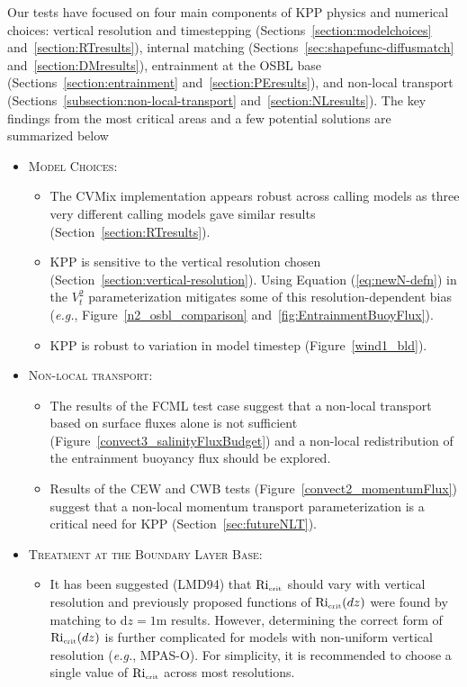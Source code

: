 \documentclass[preprint,12pt,authoryear]{agujournal}
\begin{document}
Our tests have focused on four main components of KPP physics and numerical choices: vertical resolution and timestepping (Sections~\ref{section:modelchoices} and~\ref{section:RTresults}), internal matching (Sections~\ref{sec:shapefunc-diffusmatch} and~\ref{section:DMresults}), entrainment at the OSBL base (Sections~\ref{section:entrainment} and~\ref{section:PEresults}), and non-local transport (Sections~\ref{subsection:non-local-transport} and~\ref{section:NLresults}).  The key findings from the most critical areas and a few potential solutions are summarized below
\begin{itemize}
\item \textsc{Model Choices}: 
\begin{itemize}
\item The CVMix implementation appears robust across calling models as three very different calling models gave similar results (Section~\ref{section:RTresults}).
\item KPP is sensitive to the vertical resolution chosen (Section~\ref{section:vertical-resolution}).  Using Equation (\ref{eq:newN-defn}) in the $V_t^2$ parameterization mitigates some of this resolution-dependent bias (\textit{e.g.}, Figure~\ref{n2_osbl_comparison} and~\ref{fig:EntrainmentBuoyFlux}).
\item KPP is robust to variation in model timestep (Figure~\ref{wind1_bld}).
\end{itemize} 
\item \textsc{Non-local transport}:
\begin{itemize}
\item The results of the FCML test case suggest that a non-local transport based on surface fluxes alone is not sufficient (Figure~\ref{convect3_salinityFluxBudget}) and a non-local redistribution of the entrainment buoyancy flux should be explored.
\item Results of the CEW and CWB tests (Figure~\ref{convect2_momentumFlux}) suggest that a non-local momentum transport parameterization is a critical need for KPP (Section~\ref{sec:futureNLT}).
\end{itemize}
\item \textsc{Treatment at the Boundary Layer Base}:
\begin{itemize}
\item It has been suggested (LMD94) that $\mbox{Ri}_{\mbox{\tiny crit}}$ should vary with vertical resolution and previously proposed functions of $\mbox{Ri}_{\mbox{\tiny crit}}(dz)$ were found by matching to d$z = 1$m results.  However, determining the correct form of $\mbox{Ri}_{\mbox{\tiny crit}}(dz)$ is further complicated for models with non-uniform vertical resolution (\textit{e.g.}, MPAS-O).  For simplicity, it is recommended to choose a single value of $\mbox{Ri}_{\mbox{\tiny crit}}$ across most resolutions. 

\end{itemize}
\end{itemize}
\end{document}
